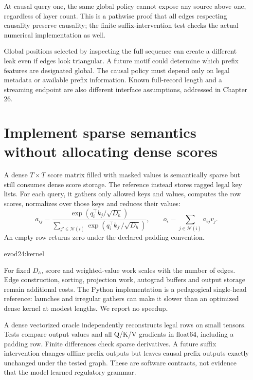At causal query one, the same global policy cannot expose any source above one,
regardless of layer count. This is a pathwise proof that all edges respecting
causality preserve causality; the finite suffix-intervention test checks the
actual numerical implementation as well.

Global positions selected by inspecting the full sequence can create a different
leak even if edges look triangular. A future motif could determine which prefix
features are designated global. The causal policy must depend only on legal
metadata or available prefix information. Known full-record length and a streaming
endpoint are also different interface assumptions, addressed in Chapter 26.

\section{Implement sparse semantics without allocating dense scores}
A dense $T\times T$ score matrix filled with masked values is semantically sparse
but still consumes dense score storage. The reference instead stores ragged legal
key lists. For each query, it gathers only allowed keys and values, computes the
row scores, normalizes over those keys and reduces their values:
\[
a_{ij}=\frac{\exp(q_i^\top k_j/\sqrt{D_h})}
{\sum_{j'\in\mathcal N(i)}\exp(q_i^\top k_{j'}/\sqrt{D_h})},
\qquad
o_i=\sum_{j\in\mathcal N(i)}a_{ij}v_j.
\]
An empty row returns zero under the declared padding convention.

{evod24:kernel}

For fixed $D_h$, score and weighted-value work scales with the number of edges.
Edge construction, sorting, projection work, autograd buffers and output storage
remain additional costs. The Python implementation is a pedagogical single-head
reference: launches and irregular gathers can make it slower than an optimized
dense kernel at modest lengths. We report no speedup.

A dense vectorized oracle independently reconstructs legal rows on small tensors.
Tests compare output values and all Q/K/V gradients in float64, including a
padding row. Finite differences check sparse derivatives. A future suffix
intervention changes offline prefix outputs but leaves causal prefix outputs
exactly unchanged under the tested graph. These are software contracts, not
evidence that the model learned regulatory grammar.

